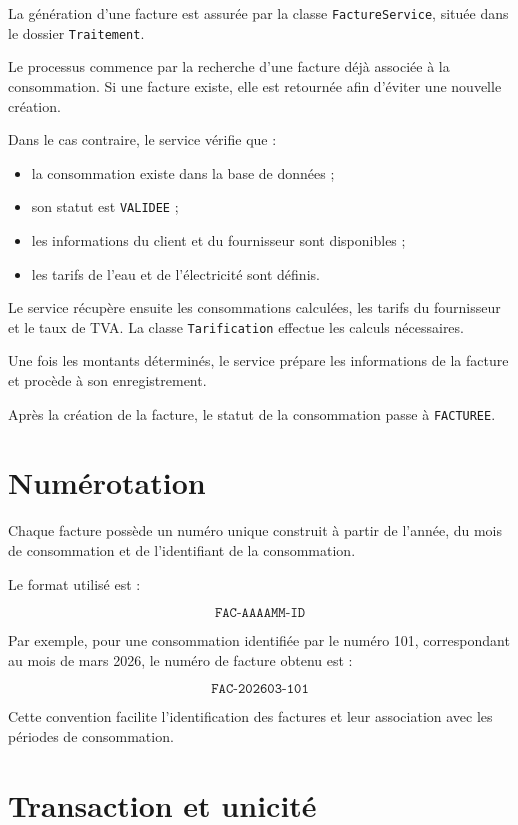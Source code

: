 La génération d'une facture est assurée par la classe \texttt{FactureService}, située dans le dossier \texttt{Traitement}.

Le processus commence par la recherche d'une facture déjà associée à la consommation. Si une facture existe, elle est retournée afin d'éviter une nouvelle création.

Dans le cas contraire, le service vérifie que :
\begin{itemize}
    \item la consommation existe dans la base de données ;
    \item son statut est \texttt{VALIDEE} ;
    \item les informations du client et du fournisseur sont disponibles ;
    \item les tarifs de l'eau et de l'électricité sont définis.
\end{itemize}

Le service récupère ensuite les consommations calculées, les tarifs du fournisseur et le taux de TVA. La classe \texttt{Tarification} effectue les calculs nécessaires.

Une fois les montants déterminés, le service prépare les informations de la facture et procède à son enregistrement.

Après la création de la facture, le statut de la consommation passe à \texttt{FACTUREE}.

\section{Numérotation}

Chaque facture possède un numéro unique construit à partir de l'année, du mois de consommation et de l'identifiant de la consommation.

Le format utilisé est :

\[
\texttt{FAC-AAAAMM-ID}
\]

Par exemple, pour une consommation identifiée par le numéro 101, correspondant au mois de mars 2026, le numéro de facture obtenu est :

\[
\texttt{FAC-202603-101}
\]

Cette convention facilite l'identification des factures et leur association avec les périodes de consommation.

\section{Transaction et unicité}

